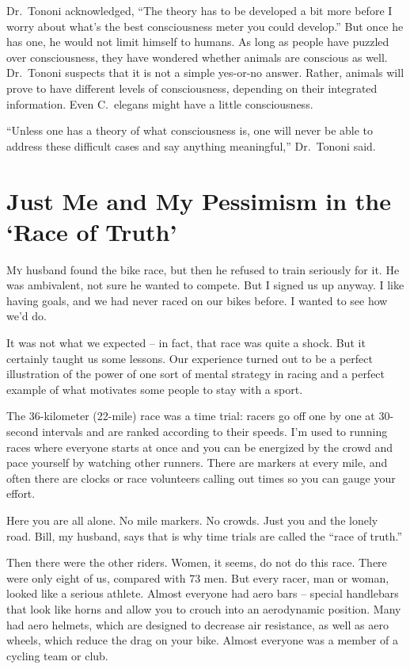﻿\documentclass[12pt]{article}
\begin{document}
Dr.~Tononi acknowledged, ``The theory has to be developed a bit more before I worry about what's the
best consciousness meter you could develop.'' But once he has one, he would not limit himself to
humans. As long as people have puzzled over consciousness, they have wondered whether animals are
conscious as well. Dr.~Tononi suspects that it is not a simple yes-or-no answer. Rather, animals
will prove to have different levels of consciousness, depending on their integrated information.
Even C.~elegans might have a little consciousness.

``Unless one has a theory of what consciousness is, one will never be able to address these
difficult cases and say anything meaningful,'' Dr.~Tononi said.

\pagebreak
\section{Just Me and My Pessimism in the `Race of Truth'}

\lettrine{M}{y} husband found the bike race, but then he refused to train
seriously for it. He was ambivalent, not sure he wanted to compete. But I signed us up anyway. I
like having goals, and we had never raced on our bikes before. I wanted to see how we'd do.

It was not what we expected -- in fact, that race was quite a shock. But it certainly taught us some
lessons. Our experience turned out to be a perfect illustration of the power of one sort of mental
strategy in racing and a perfect example of what motivates some people to stay with a sport.

The 36-kilometer (22-mile) race was a time trial: racers go off one by one at 30-second intervals
and are ranked according to their speeds. I'm used to running races where everyone starts at once
and you can be energized by the crowd and pace yourself by watching other runners. There are markers
at every mile, and often there are clocks or race volunteers calling out times so you can gauge your
effort.

Here you are all alone. No mile markers. No crowds. Just you and the lonely road. Bill, my husband,
says that is why time trials are called the ``race of truth.''

Then there were the other riders. Women, it seems, do not do this race. There were only eight of us,
compared with 73 men. But every racer, man or woman, looked like a serious athlete. Almost everyone
had aero bars -- special handlebars that look like horns and allow you to crouch into an aerodynamic
position. Many had aero helmets, which are designed to decrease air resistance, as well as aero
wheels, which reduce the drag on your bike. Almost everyone was a member of a cycling team or club.
\end{document}
